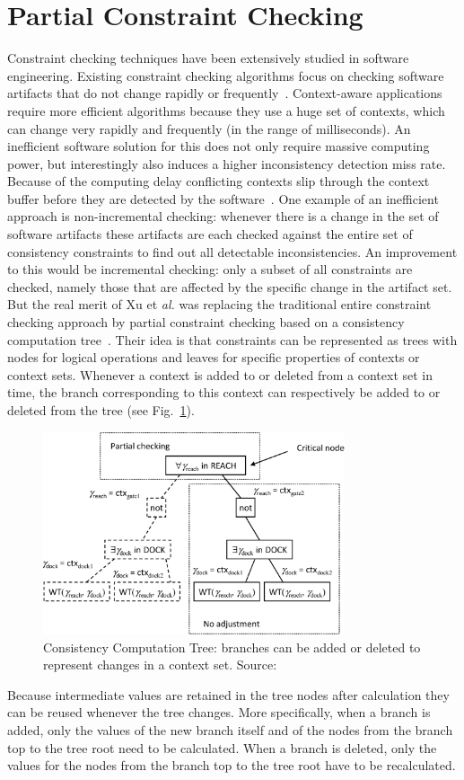 \documentclass[journal]{vgtc}                %
\begin{document}
\section{Partial Constraint Checking}
Constraint checking techniques have been extensively studied in software engineering. Existing constraint checking algorithms focus on checking software artifacts that do not change rapidly or frequently~\cite{xu:2010:PCC}. Context-aware applications require more efficient algorithms because they use a huge set of contexts, which can change very rapidly and frequently (in the range of milliseconds). An inefficient software solution for this does not only require massive computing power, but interestingly also induces a higher inconsistency detection miss rate. Because of the computing delay conflicting contexts slip through the context buffer before they are detected by the software~\cite{xu:2010:PCC}. One example of an inefficient approach is non-incremental checking: whenever there is a change in the set of software artifacts these artifacts are each checked against the entire set of consistency constraints to find out all detectable inconsistencies. An improvement to this would be incremental checking: only a subset of all constraints are checked, namely those that are affected by the specific change in the artifact set. But the real merit of Xu et \textit{al.} was replacing the traditional entire constraint checking approach by partial constraint checking based on a consistency computation tree~\cite{xu:2010:PCC}. Their idea is that constraints can be represented as trees with nodes for logical operations and leaves for specific properties of contexts or context sets. Whenever a context is added to or deleted from a context set in time, the branch corresponding to this context can respectively be added to or deleted from the tree (see Fig.~\ref{fig:cct}). 
\begin{figure}[htb]
  \centering
  \includegraphics[width=3.5in]{cons_comp_tree}
  \caption{Consistency Computation Tree: branches can be added or deleted to represent changes in a context set. Source:~\cite{xu:2010:PCC}}
  \label{fig:cct}
\end{figure}
Because intermediate values are retained in the tree nodes after calculation they can be reused whenever the tree changes. More specifically, when a branch is added, only the values of the new branch itself and of the nodes from the branch top to the tree root need to be calculated. When a branch is deleted, only the values for the nodes from the branch top to the tree root have to be recalculated. 
\end{document}
